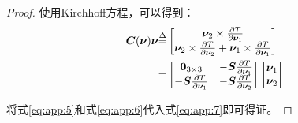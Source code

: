 \begin{thm}
\begin{proof}
使用Kirchhoff方程\cite{fossen1994guidance}，可以得到：
\begin{equation}
\label{eq:app:7}
\begin{aligned}
\bm{C}(\bm{\nu}) \bm{\nu} {\buildrel \Delta \over =}& \begin{bmatrix}
                                      {\bm{\nu}_2} \times {\frac{\partial T}{ \partial {\bm{\nu}_1}}} \\
{\bm{\nu}_2} \times \frac{ \partial T} { \partial {\bm{\nu}_2}} + {\bm{\nu}_1 } \times {\frac{\partial T}{\partial \bm{\nu}_1}}\\
\end{bmatrix} \\
=&\begin{bmatrix}
   \bm{0}_{3 \times 3} & -\bm{S} \frac{\partial T }{ \partial {\bm{\nu}_1}}   \\
   -\bm{S} \frac{\partial T }{ \partial {\bm{\nu}_1}}  & -\bm{S} \frac{\partial T }{ \partial {\bm{\nu}_2}}   \\
 \end{bmatrix}
 \begin{bmatrix}
    \bm{\nu}_1 \\
    \bm{\nu}_2 \\
 \end{bmatrix}
\end{aligned}
\end{equation}

将式\ref{eq:app:5}和式\ref{eq:app:6}代入式\ref{eq:app:7}即可得证。
\end{proof}
\end{thm}




